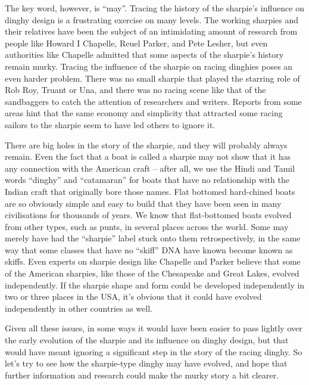 \documentclass[
  letterpaper,
]{scrbook}
\begin{document}
The key word, however, is ``may''. Tracing the history of the sharpie's
influence on dinghy design is a frustrating exercise on many levels. The
working sharpies and their relatives have been the subject of an
intimidating amount of research from people like Howard I Chapelle,
Reuel Parker, and Pete Lesher, but even authorities like Chapelle
admitted that some aspects of the sharpie's history remain murky.
Tracing the influence of the sharpie on racing dinghies poses an even
harder problem. There was no small sharpie that played the starring role
of Rob Roy, Truant or Una, and there was no racing scene like that of
the sandbaggers to catch the attention of researchers and writers.
Reports from some areas hint that the same economy and simplicity that
attracted some racing sailors to the sharpie seem to have led others to
ignore it.

There are big holes in the story of the sharpie, and they will probably
always remain. Even the fact that a boat is called a sharpie may not
show that it has any connection with the American craft -- after all, we
use the Hindi and Tamil words ``dinghy'' and ``catamaran'' for boats
that have no relationship with the Indian craft that originally bore
those names. Flat bottomed hard-chined boats are so obviously simple and
easy to build that they have been seen in many civilisations for
thousands of years. We know that flat-bottomed boats evolved from other
types, such as punts, in several places across the world. Some may
merely have had the ``sharpie'' label stuck onto them retrospectively,
in the same way that some classes that have no ``skiff'' DNA have known
become known as skiffs. Even experts on sharpie design like Chapelle and
Parker believe that some of the American sharpies, like those of the
Chesapeake and Great Lakes, evolved independently. If the sharpie shape
and form could be developed independently in two or three places in the
USA, it's obvious that it could have evolved independently in other
countries as well.

Given all these issues, in some ways it would have been easier to pass
lightly over the early evolution of the sharpie and its influence on
dinghy design, but that would have meant ignoring a significant step in
the story of the racing dinghy. So let's try to see how the sharpie-type
dinghy may have evolved, and hope that further information and research
could make the murky story a bit clearer.
\end{document}
